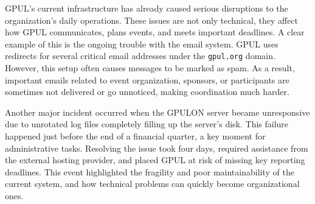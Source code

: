GPUL's current infrastructure has already caused serious disruptions to the organization's daily operations. These issues are not only technical, they affect how GPUL communicates, plans events, and meets important deadlines. A clear example of this is the ongoing trouble with the email system. GPUL uses redirects for several critical email addresses under the \texttt{gpul.org} domain. However, this setup often causes messages to be marked as spam. As a result, important emails related to event organization, sponsors, or participants are sometimes not delivered or go unnoticed, making coordination much harder.

Another major incident occurred when the GPULON server became unresponsive due to unrotated log files completely filling up the server's disk. This failure happened just before the end of a financial quarter, a key moment for administrative tasks. Resolving the issue took four days, required assistance from the external hosting provider, and placed GPUL at risk of missing key reporting deadlines. This event highlighted the fragility and poor maintainability of the current system, and how technical problems can quickly become organizational ones.

